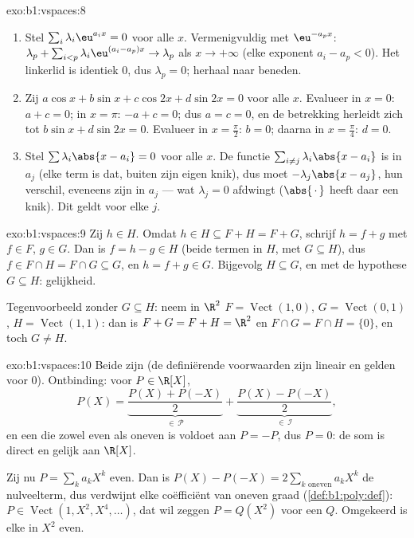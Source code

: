 \begin{solution}{exo:b1:vspaces:8}
\begin{enumerate}
  \item Stel $\sum_{i} \lambda_i \eu^{a_i x} = 0$ voor alle $x$.
        Vermenigvuldig met $\eu^{-a_p x}$: $\lambda_p + \sum_{i < p}
        \lambda_i \eu^{(a_i - a_p)x} \to \lambda_p$ als $x \to
        +\infty$ (elke exponent $a_i - a_p < 0$). Het linkerlid is
        identiek $0$, dus $\lambda_p = 0$; herhaal naar beneden.
  \item Zij $a\cos x + b \sin x + c \cos 2x + d\sin 2x = 0$ voor
        alle $x$. Evalueer in $x = 0$: $a + c = 0$; in $x = \pi$:
        $-a + c = 0$; dus $a = c = 0$, en de betrekking herleidt
        zich tot $b\sin x + d \sin 2x = 0$. Evalueer in $x =
        \frac\pi2$: $b = 0$; daarna in $x = \frac\pi4$: $d = 0$.
  \item Stel $\sum \lambda_i \abs{x - a_i} = 0$ voor alle $x$. De
        functie $\sum_{i \neq j} \lambda_i\abs{x - a_i}$ is
         in $a_j$ (elke term is dat, buiten zijn eigen
        knik), dus moet $-\lambda_j \abs{x - a_j}$, hun verschil,
        eveneens  zijn in $a_j$ --- wat $\lambda_j = 0$
        afdwingt ($\abs{\,\cdot\,}$ heeft daar een knik). Dit geldt
        voor elke $j$.
\end{enumerate}
\end{solution}

\begin{solution}{exo:b1:vspaces:9}
Zij $h \in H$. Omdat $h \in H \subseteq F + H = F + G$, schrijf $h =
f + g$ met $f \in F$, $g \in G$. Dan is $f = h - g \in H$ (beide
termen in $H$, met $G \subseteq H$), dus $f \in F \cap H = F \cap G
\subseteq G$, en $h = f + g \in G$. Bijgevolg $H \subseteq G$, en
met de hypothese $G \subseteq H$: gelijkheid.

Tegenvoorbeeld zonder $G \subseteq H$: neem in $\R^2$ $F =
\operatorname{Vect}(1,0)$, $G = \operatorname{Vect}(0,1)$, $H =
\operatorname{Vect}(1,1)$: dan is $F + G = F + H = \R^2$ en $F \cap
G = F \cap H = \{0\}$, en toch $G \neq H$.
\end{solution}

\begin{solution}{exo:b1:vspaces:10}
Beide  zijn  (de definiërende voorwaarden
zijn lineair en gelden voor $0$). Ontbinding: voor $P \in \R[X]$,
\[
P(X) = \underbrace{\frac{P(X) + P(-X)}{2}}_{\in\,\mathcal P}
+ \underbrace{\frac{P(X) - P(-X)}{2}}_{\in\,\mathcal I},
\]
en een  die zowel even als oneven is voldoet aan $P = -P$,
dus $P = 0$: de som is direct en gelijk aan $\R[X]$.

Zij nu $P = \sum_k a_k X^k$ even. Dan is $P(X) - P(-X) = 2 \sum_{k
\text{ oneven}} a_k X^k$ de nulveelterm, dus verdwijnt elke
coëfficiënt van oneven graad (\cref{def:b1:poly:def}): $P \in
\operatorname{Vect}(1, X^2, X^4, \dots)$, dat wil zeggen $P =
Q(X^2)$ voor een  $Q$. Omgekeerd is elke  in $X^2$
even.
\end{solution}

